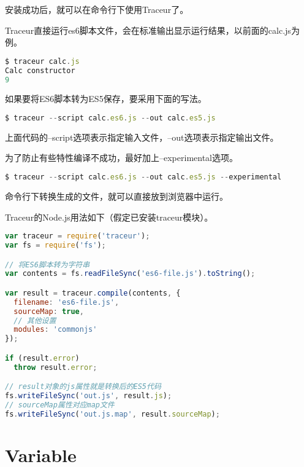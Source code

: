 安装成功后，就可以在命令行下使用Traceur了。

Traceur直接运行es6脚本文件，会在标准输出显示运行结果，以前面的calc.js为例。


\begin{lstlisting}[language=JavaScript]
$ traceur calc.js
Calc constructor
9
\end{lstlisting}


如果要将ES6脚本转为ES5保存，要采用下面的写法。


\begin{lstlisting}[language=JavaScript]
$ traceur --script calc.es6.js --out calc.es5.js
\end{lstlisting}

上面代码的--script选项表示指定输入文件，--out选项表示指定输出文件。

为了防止有些特性编译不成功，最好加上--experimental选项。


\begin{lstlisting}[language=JavaScript]
$ traceur --script calc.es6.js --out calc.es5.js --experimental
\end{lstlisting}

命令行下转换生成的文件，就可以直接放到浏览器中运行。


Traceur的Node.js用法如下（假定已安装traceur模块）。


\begin{lstlisting}[language=JavaScript]
var traceur = require('traceur');
var fs = require('fs');

// 将ES6脚本转为字符串
var contents = fs.readFileSync('es6-file.js').toString();

var result = traceur.compile(contents, {
  filename: 'es6-file.js',
  sourceMap: true,
  // 其他设置
  modules: 'commonjs'
});

if (result.error)
  throw result.error;

// result对象的js属性就是转换后的ES5代码
fs.writeFileSync('out.js', result.js);
// sourceMap属性对应map文件
fs.writeFileSync('out.js.map', result.sourceMap);
\end{lstlisting}



\chapter{Variable}






\begin{lstlisting}[language=JavaScript]

\end{lstlisting}




